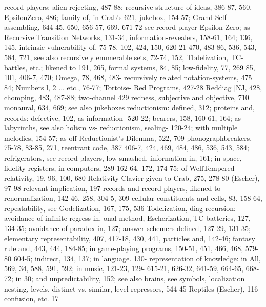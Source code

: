 record players: alien-rejecting, 487-88;       recursive structure of ideas, 386-87, 560,
EpsilonZero, 486; family of, in Crab's         621,
jukebox, 154-57; Grand Self-assembling,        644-45, 650, 656-57, 669. 671-72
see record player Epsilon-Zero; as             Recursive Transition Networks, 131-34,
information-revealers,      158-61,     164;   136, 145,
intrinsic vulnerability of, 75-78, 102, 424,   150, 620-21
470, 483-86, 536, 543, 584, 721, see also      recursively enumerable sets, 72-74, 152,
Tbdelization, TC-battles, etc.; likened to     191, 265,
formal systems, 84, 85; low-fidelity, 77,      269
85, 101, 406-7, 470; Omega, 78, 468, 483-      recursively related notation-systems, 475
84; Numbers l, 2 ... etc., 76-77; Tortoise-    Red Programs, 427-28 Reddiag [NJ, 428,
chomping, 483, 487-88; two-channel             429 redness, subjective and objective, 710
monaural, 634, 669; see also jukeboxes         reductionism: defined, 312; proteins and,
records: defective, 102, as information-       520-22;
bearers, 158, 160-61, 164; as labyrinths,      see also holism vs- reductionism, sealing-
120-24; with multiple melodies, 154-57; as     off Reductionist's Dilemma, 522, 709
phonographbreakers, 75-78, 83-85, 271,         reentrant code, 387
406-7, 424, 469, 484, 486, 536, 543, 584;      refrigerators, see record players, low
smashed, information in, 161; in space,        fidelity registers, in computers, 289
162-64, 172, 174-75; of WellTempered           relativity, 19, 96, 100, 680 Relativity
Clavier given to Crab, 275, 278-80             (Escher), 97-98 relevant implication, 197
records and record players, likened to         renormalization, 142-46, 258, 304-5, 309
cellular constituents and cells, 83, 158-64,   repeatability,       see       Godelization,
167, 175, 536                                  Todelization, diag
recursion: avoidance of infinite regress in,   onal method, Escherization, TC-batteries,
127, 134-35; avoidance of paradox in, 127;     answer-schemers
defined, 127-29, 131-35; elementary            representability, 407, 417-18, 430, 441,
particles and, 142-46; fantasy rule and,       443, 444,
184-85; in game-playing programs, 150-51,      451, 466, 468, 579-80
604-5; indirect, 134, 137; in language. 130-   representation of knowledge: in All, 569,
34, 588, 591, 592; in music, 121-23, 129-      615-21, 626-32, 641-59, 664-65, 668-72; in
30; and unpredictability, 152; see also        brains, see symbols, localization
nesting, levels, distinct vs. similar, level   repressors, 544-45 Reptiles (Escher), 116-
confusion, etc.                                17
